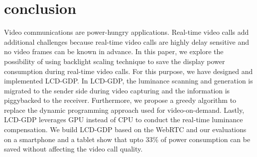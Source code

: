 \section{conclusion}
\label{sec:conclusion}
Video communications are power-hungry applications. Real-time video calls add additional challenges because real-time video calls are highly delay sensitive and no video frames can be known in advance. In this paper, we explore the possibility of using backlight scaling technique to save the display power consumption during real-time video calls. For this purpose, we have designed and implemented LCD-GDP. In LCD-GDP, the luminance scanning and generation is migrated to the sender side during video capturing and the information is piggybacked to the receiver. Furthermore, we propose a greedy algorithm to replace the dynamic programming approach used for video-on-demand. Lastly, LCD-GDP leverages GPU instead of CPU to conduct the real-time luminance compensation. We build LCD-GDP based on the WebRTC and our evaluations on a smartphone and a tablet show that upto 33\% of power consumption can be saved without affecting the video call quality.


